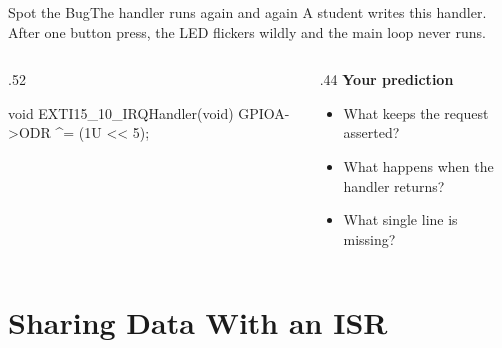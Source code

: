 \documentclass[9pt,aspectratio=169,xcolor=table]{beamer}
\begin{document}
{\beamerextras
\begin{frame}[fragile]{Spot the Bug}{The handler runs again and again}
    \leavevmode
    A student writes this handler. After one button press, the LED flickers wildly and the main loop never runs.

    \vspace{2mm}
    \begin{columns}[T]
    \begin{column}{.52\textwidth}
\begin{cc}[basicstyle=\ttfamily\small]
void EXTI15_10_IRQHandler(void) {
    GPIOA->ODR ^= (1U << 5);
}
\end{cc}
    \end{column}
    \begin{column}{.44\textwidth}
        \textbf{Your prediction}
        {\small
        \begin{itemize}\itemsep2pt
            \item What keeps the request asserted?
            \item What happens when the handler returns?
            \item What single line is missing?
        \end{itemize}}
    \end{column}
    \end{columns}

    \vspace{2mm}
\end{frame}
}


\section{Sharing Data With an ISR}
\end{document}

